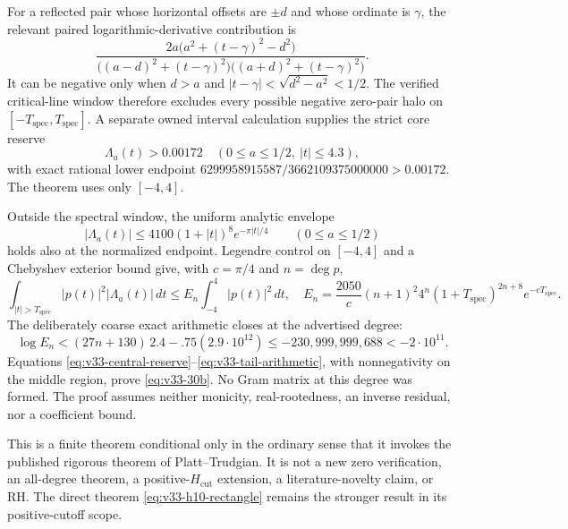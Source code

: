 \documentclass[11pt]{article}
\theoremstyle{definition}
\theoremstyle{remark}
\begin{document}
For a reflected pair whose horizontal offsets are $\pm d$ and whose ordinate
is $\gamma$, the relevant paired logarithmic-derivative contribution is
\begin{equation}
 \frac{2a\bigl(a^2+(t-\gamma)^2-d^2\bigr)}
 {\bigl((a-d)^2+(t-\gamma)^2\bigr)
  \bigl((a+d)^2+(t-\gamma)^2\bigr)}.
 \label{eq:v33-zero-pair}
\end{equation}
It can be negative only when $d>a$ and
$|t-\gamma|<\sqrt{d^2-a^2}<1/2$.  The verified critical-line window therefore
excludes every possible negative zero-pair halo on
$[-T_{\mathrm{spec}},T_{\mathrm{spec}}]$.  A separate owned interval
calculation supplies the strict core reserve
\begin{equation}
 \Lambda_a(t)>0.00172
 \quad(0\le a\le1/2,\ |t|\le4.3),
 \label{eq:v33-central-reserve}
\end{equation}
with exact rational lower endpoint
$6299958915587/3662109375000000>0.00172$.  The theorem uses only $[-4,4]$.

Outside the spectral window, the uniform analytic envelope
\begin{equation}
 |\Lambda_a(t)|\le4100(1+|t|)^8e^{-\pi|t|/4}
 \qquad(0\le a\le1/2)
 \label{eq:v33-gamma-envelope}
\end{equation}
holds also at the normalized endpoint.  Legendre control on $[-4,4]$ and a
Chebyshev exterior bound give, with $c=\pi/4$ and $n=\deg p$,
\begin{equation}
 \int_{|t|>T_{\mathrm{spec}}}|p(t)|^2|\Lambda_a(t)|\,dt
 \le E_n\int_{-4}^{4}|p(t)|^2\,dt,
 \quad
 E_n=\frac{2050}{c}(n+1)^2 4^n
 (1+T_{\mathrm{spec}})^{2n+8}e^{-cT_{\mathrm{spec}}}.
 \label{eq:v33-tail-factor}
\end{equation}
The deliberately coarse exact arithmetic closes at the advertised degree:
\begin{equation}
 \log E_n<(27n+130)\,2.4-.75(2.9\cdot10^{12})
 \le-230{,}999{,}999{,}688<-2\cdot10^{11}.
 \label{eq:v33-tail-arithmetic}
\end{equation}
Equations \eqref{eq:v33-central-reserve}--\eqref{eq:v33-tail-arithmetic}, with
nonnegativity on the middle region, prove \eqref{eq:v33-30b}. No Gram matrix at
this degree was formed. The proof assumes neither monicity, real-rootedness, an
inverse residual, nor a coefficient bound.

This is a finite theorem conditional only in the ordinary sense that it invokes
the published rigorous theorem of Platt--Trudgian.  It is not a new zero
verification, an all-degree theorem, a positive-$H_{\mathrm{cut}}$ extension, a
literature-novelty claim, or RH.  The direct theorem
\eqref{eq:v33-h10-rectangle} remains the stronger result in its positive-cutoff
scope.
\end{document}
